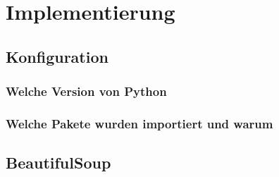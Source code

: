 \documentclass[a4paper,oneside,12pt]{report}
\begin{document}
	
	
	\chapter{Implementierung}
	
		\section{Konfiguration}
	
			\subsection{Welche Version von Python}
	
			\subsection{Welche Pakete wurden importiert und warum}
	
		\section{BeautifulSoup}
		
\end{document}
